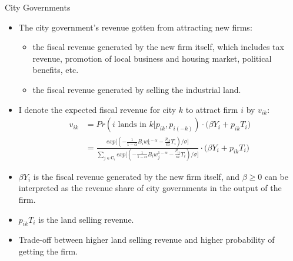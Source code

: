 \documentclass[xcolor={dvipsnames}]{beamer}
\theoremstyle{plain}
\begin{document}
\begin{frame}{City Governments}
    \begin{itemize}
        \item The city government's revenue gotten from attracting new firms:
              \begin{itemize}
                  \item the fiscal revenue generated by the new firm itself, which includes
                        tax revenue, promotion of local business and housing market, political benefits,
                        etc.
                  \item the fiscal revenue generated by selling the industrial land.
              \end{itemize}
        \item I denote the expected fiscal revenue for city $k$ to attract firm $i$ by $v_{ik}$:
              \begin{equation}
                  \begin{aligned}
                      v_{ik} & = Pr(i\text{ lands in }k| p_{ik}, p_{i(-k)})
                      \cdot \big(\beta Y_i + p_{ik}T_i\big)                            \\
                             & = \frac{exp\big[(-\frac{1}{1-\alpha} B_i w_k^{1-\alpha}
                      - \frac{p_{ik}}{m}T_i)/\sigma\big]}
                      {\sum_{j\in \mathbf{C}_i} exp\big[(-\frac{1}{1-\alpha} B_i w_j^{1-\alpha}
                      - \frac{p_{ij}}{m} T_i)/\sigma\big]}
                      \cdot \big(\beta Y_i + p_{ik}T_i\big)
                  \end{aligned}
                  \label{gov revenue}
              \end{equation}

        \item  $\beta Y_i$ is the fiscal revenue generated by the new firm itself, and $\beta \geq 0$
              can be interpreted as the revenue share of city governments in the output of the firm.
        \item $p_{ik}T_i$ is the land selling revenue.
        \item Trade-off between higher land selling revenue and higher probability of getting the firm.
    \end{itemize}
\end{frame}
\end{document}
